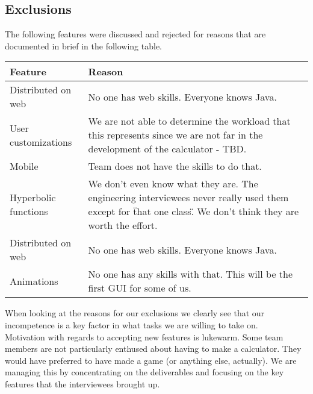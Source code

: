 \documentclass{article}
\begin{document}
\subsection{Exclusions}

The following features were discussed and rejected for reasons that are documented in brief in the following table.

\begin{tabular}[!h]{|p{3.5cm} | p{10cm}|}
\hline 
\textbf{Feature} & \textbf{Reason} \\ 
\hline 
Distributed on web & No one has web skills. Everyone knows Java. \\ 
\hline
User customizations & We are not able to determine the workload that this represents since we are not far in the development of the calculator - TBD.  \\ 
\hline
Mobile & Team does not have the skills to do that. \\
\hline
Hyperbolic functions & We don't even know what they are. The engineering interviewees never really used them except for \"that one class\". We don't think they are worth the effort. \\
\hline
Distributed on web & No one has web skills. Everyone knows Java. \\ 
\hline
Animations & No one has any skills with that. This will be the first GUI for some of us. \\ 
\hline
\end{tabular} 
\medskip

When looking at the reasons for our exclusions we clearly see that our incompetence is a key factor in what tasks we are willing to take on. \\

Motivation with regards to accepting new features is lukewarm. Some team members are not particularly enthused about having to make a calculator. They would have preferred to have made a game (or anything else, actually). We are managing this by concentrating on the deliverables and focusing on the key features that the interviewees brought up.
\end{document}
